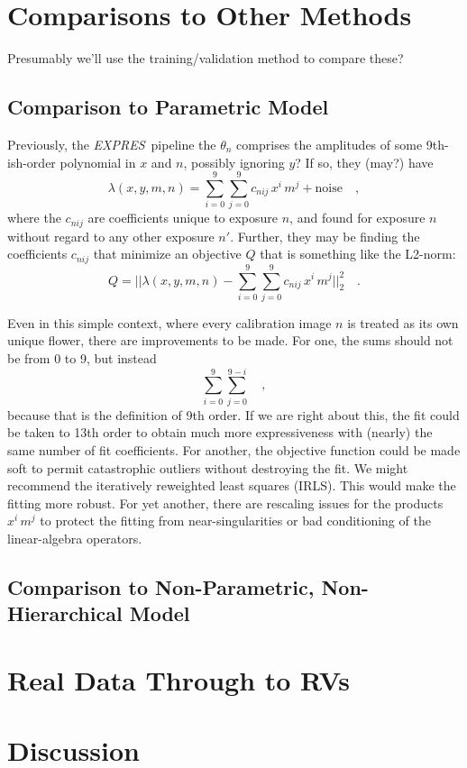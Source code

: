 \documentclass[12pt, letterpaper]{article}
\newcommand{\project}[1]{\textsl{#1}}
\newcommand{\acronym}[1]{{\small{#1}}}
\newcommand{\expres}{\project{\acronym{EXPRES}}}
\begin{document}
\section{Comparisons to Other Methods} \label{sec:comparisons}
Presumably we'll use the training/validation method to compare these?

\subsection{Comparison to Parametric Model}
Previously, the \expres\ pipeline the $\theta_{n}$ comprises the
amplitudes of some 9th-ish-order polynomial in $x$ and $n$, possibly
ignoring $y$?
If so, they (may?) have
\begin{equation}
\lambda(x,y,m,n) = \sum_{i=0}^9\sum_{j=0}^9 c_{nij}\, x^i\,m^j + \mathrm{noise}
\quad ,
\end{equation}
where the $c_{nij}$ are coefficients unique to exposure $n$, and
found for exposure $n$ without regard to any other exposure $n'$.
Further, they may be finding the coefficients $c_{nij}$ that
minimize an objective $Q$ that is something like the L2-norm:
\begin{equation}
Q = ||\lambda(x,y,m,n) - \sum_{i=0}^9\sum_{j=0}^9 c_{nij}\, x^i\,m^j||_2^2
\quad .
\end{equation}

Even in this simple context, where every calibration image $n$ is
treated as its own unique flower, there are improvements to be
made.
For one, the sums should not be from 0 to 9, but instead
\begin{equation}
\sum_{i=0}^9\sum_{j=0}^{9-i}
\quad ,
\end{equation}
because that is the definition of 9th order.
If we are right about this, the fit could be taken to 13th order to obtain
much more expressiveness with (nearly) the same number of fit coefficients.
For another, the objective function could be made soft to permit
catastrophic outliers without destroying the fit.
We might recommend the iteratively reweighted least squares (IRLS).
This would make the fitting more robust.
For yet another, there are rescaling issues for the products $x^i\,m^j$ to
protect the fitting from near-singularities or bad conditioning of the
linear-algebra operators.

\subsection{Comparison to Non-Parametric, Non-Hierarchical Model}


\section{Real Data Through to RVs} \label{sec:realdata}

\section{Discussion} \label{sec:discussion}
\end{document}
